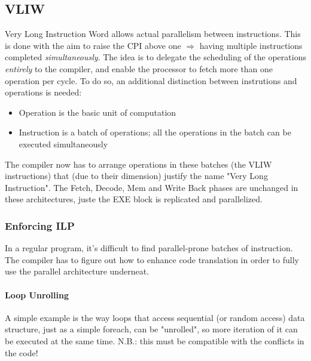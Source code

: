 \documentclass[10pt,a4paper]{article}
\begin{document}
			\subsection{VLIW}
				Very Long Instruction Word allows actual parallelism between instructions. This is done with the aim to raise the CPI above one $\Rightarrow$ having multiple instructions completed \emph{simultaneously}. The idea is to delegate the scheduling of the operations \emph{entirely} to the compiler, and enable the processor to fetch more than one operation per cycle. To do so, an additional distinction between instrutions and operations is needed:
				\begin{itemize}
					\item Operation is the basic unit of computation
					\item Instruction is a batch of operations; all the operations in the batch can be executed simultaneously
				\end{itemize}
				The compiler now has to arrange operations in these batches (the VLIW instructions) that (due to their dimension) justify the name "Very Long Instruction". The Fetch, Decode, Mem and Write Back phases are unchanged in these architectures, juste the EXE block is replicated and parallelized.
				
				\subsubsection{Enforcing ILP}
					In a regular program, it's difficult to find parallel-prone batches of instruction. The compiler has to figure out how to enhance code translation in order to fully use the parallel architecture underneat.
					
					\paragraph{Loop Unrolling}
						A simple example is the way loops that access sequential (or random access) data structure, just as a simple foreach, can be "unrolled", so more iteration of it can be executed at the same time. N.B.: this must be compatible with the conflicts in the code!
						
\end{document}
